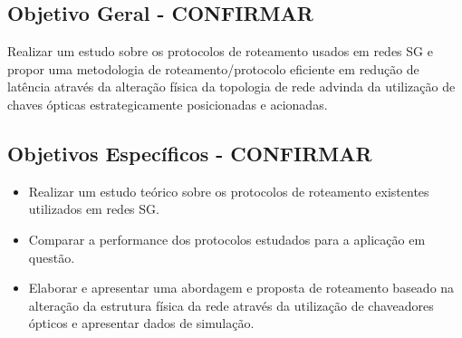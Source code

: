\subsection{Objetivo Geral - CONFIRMAR}
Realizar um estudo sobre os protocolos de roteamento usados em redes SG e propor uma metodologia de roteamento/protocolo eficiente em redução de latência através da alteração física da topologia de rede advinda da utilização de chaves ópticas estrategicamente posicionadas e acionadas.
\subsection{Objetivos Específicos - CONFIRMAR}
\begin{itemize}
	\item Realizar um estudo teórico sobre os protocolos de roteamento existentes utilizados em redes SG.
	\item Comparar a performance dos protocolos estudados para a aplicação em questão.
	\item Elaborar e apresentar uma abordagem e proposta de roteamento baseado na alteração da estrutura física da rede através da utilização de chaveadores ópticos e apresentar dados de simulação.
\end{itemize}